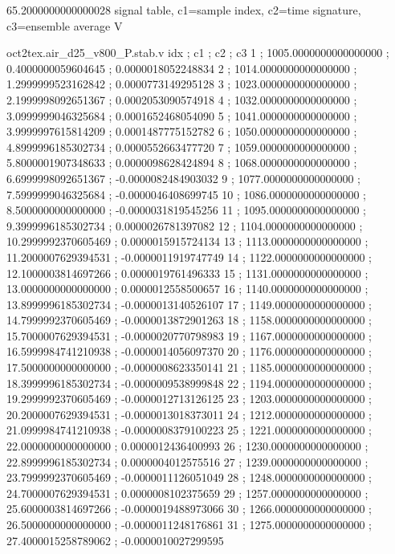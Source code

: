 \expandafter\def\csname oct2tex.air_d25_v800_P.hub.v\endcsname{65.2000000000000028}
\expandafter\def\csname oct2tex.air_d25_v800_P.stab.d\endcsname{signal table, c1=sample index, c2=time signature, c3=ensemble average}
\expandafter\def\csname oct2tex.air_d25_v800_P.stab.u\endcsname{\ensuremath{\text{V}}}
\begin{filecontents}[overwrite]{oct2tex.air_d25_v800_P.stab.v}
idx ; c1 ; c2 ; c3
1 ; 1005.0000000000000000 ; 0.4000000059604645 ; 0.0000018052248834
2 ; 1014.0000000000000000 ; 1.2999999523162842 ; 0.0000773149295128
3 ; 1023.0000000000000000 ; 2.1999998092651367 ; 0.0002053090574918
4 ; 1032.0000000000000000 ; 3.0999999046325684 ; 0.0001652468054090
5 ; 1041.0000000000000000 ; 3.9999997615814209 ; 0.0001487775152782
6 ; 1050.0000000000000000 ; 4.8999996185302734 ; 0.0000552663477720
7 ; 1059.0000000000000000 ; 5.8000001907348633 ; 0.0000098628424894
8 ; 1068.0000000000000000 ; 6.6999998092651367 ; -0.0000082484903032
9 ; 1077.0000000000000000 ; 7.5999999046325684 ; -0.0000046408699745
10 ; 1086.0000000000000000 ; 8.5000000000000000 ; -0.0000031819545256
11 ; 1095.0000000000000000 ; 9.3999996185302734 ; 0.0000026781397082
12 ; 1104.0000000000000000 ; 10.2999992370605469 ; 0.0000015915724134
13 ; 1113.0000000000000000 ; 11.2000007629394531 ; -0.0000011919747749
14 ; 1122.0000000000000000 ; 12.1000003814697266 ; 0.0000019761496333
15 ; 1131.0000000000000000 ; 13.0000000000000000 ; 0.0000012558500657
16 ; 1140.0000000000000000 ; 13.8999996185302734 ; -0.0000013140526107
17 ; 1149.0000000000000000 ; 14.7999992370605469 ; -0.0000013872901263
18 ; 1158.0000000000000000 ; 15.7000007629394531 ; -0.0000020770798983
19 ; 1167.0000000000000000 ; 16.5999984741210938 ; -0.0000014056097370
20 ; 1176.0000000000000000 ; 17.5000000000000000 ; -0.0000008623350141
21 ; 1185.0000000000000000 ; 18.3999996185302734 ; -0.0000009538999848
22 ; 1194.0000000000000000 ; 19.2999992370605469 ; -0.0000012713126125
23 ; 1203.0000000000000000 ; 20.2000007629394531 ; -0.0000013018373011
24 ; 1212.0000000000000000 ; 21.0999984741210938 ; -0.0000008379100223
25 ; 1221.0000000000000000 ; 22.0000000000000000 ; 0.0000012436400993
26 ; 1230.0000000000000000 ; 22.8999996185302734 ; 0.0000004012575516
27 ; 1239.0000000000000000 ; 23.7999992370605469 ; -0.0000011126051049
28 ; 1248.0000000000000000 ; 24.7000007629394531 ; 0.0000008102375659
29 ; 1257.0000000000000000 ; 25.6000003814697266 ; -0.0000019488973066
30 ; 1266.0000000000000000 ; 26.5000000000000000 ; -0.0000011248176861
31 ; 1275.0000000000000000 ; 27.4000015258789062 ; -0.0000010027299595

\end{filecontents}

